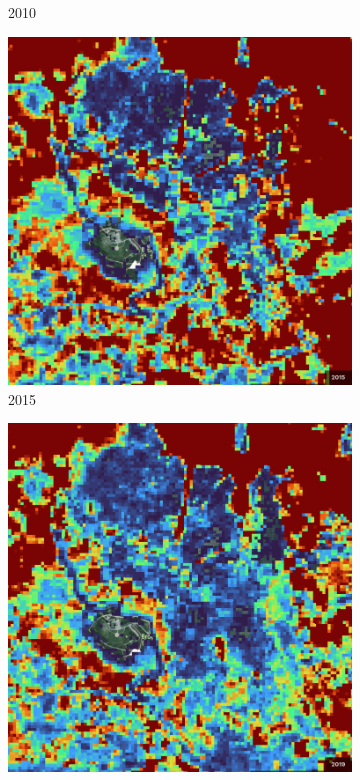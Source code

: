 \begin{figure}[H]
\begin{subfigure}[t]{0.24\textwidth}
        \caption{2010}
        \end{subfigure}
        \hfill
        \begin{subfigure}[t]{0.24\textwidth}
        \centering
        \includegraphics[width=\linewidth,height=\linewidth]{figs_06/brocken_2015.png}
        \caption{2015}
        \end{subfigure}
        \hfill
        \begin{subfigure}[t]{0.24\textwidth}
        \centering
        \includegraphics[width=\linewidth,height=\linewidth]{figs_06/brocken_2019.png}

\end{subfigure}
\end{figure}
